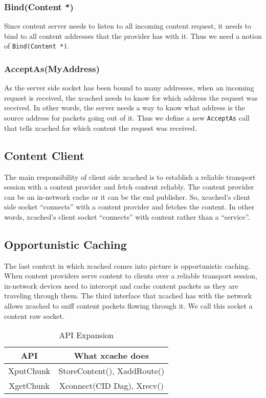 \subsubsection{Bind(Content *)}
Since content server needs to listen to all incoming content
request, it needs to bind to all content addresses that the provider
has with it. Thus we need a notion of \texttt{Bind(Content *)}.

\subsubsection{AcceptAs(MyAddress)}
As the server side socket has been bound to many addresses, when an
incoming request is received, the xcached needs to know for which
address the request was received. In other words, the server needs a
way to know what address is the source address for packets going out
of it. Thus we define a new \texttt{AcceptAs} call that tells xcached
for which content the request was received.

\subsection{Content Client}
The main responsibility of client side xcached is to establish a
reliable transport session with a content provider and fetch content
reliably. The content provider can be an in-network cache or it can be
the end publisher. So, xcached's client side socket ``connects'' with a
content provider and fetches the content. In other words, xcached's
client socket ``connects'' with content rather than a ``service''.

\subsection{Opportunistic Caching}
The last context in which xcached comes into picture is opportunistic
caching. When content providers serve content to clients over a
reliable transport session, in-network devices need to intercept and
cache content packets as they are traveling through them. The third
interface that xcached has with the network allows xcached to sniff
content packets flowing through it. We call this socket a content raw
socket.

\begin{table}
  \begin{center}
    \begin{tabular}
      {| c | c |}
      API & What xcache does \\
      \hline
      XputChunk & StoreContent(), XaddRoute() \\
      XgetChunk & Xconnect(CID Dag), Xrecv() \\
    \end{tabular}
  \end{center}
  \caption{API Expansion}
  \label{tab:apis}
\end{table}
